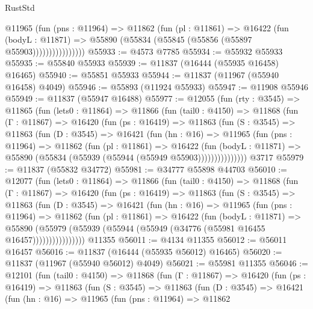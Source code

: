 \begin{lexlean}{RustStd}
\begin{coremodule}
{\begin{coremodule}
{{{{{{{{{{{{{{{{{{{{{{{{{{{{{{{{{{{{{{{{{{{{{{{{{{                    @11965
                      (fun (pns : @11964) =>
                      @11862
                        (fun (pl : @11861) =>
                        @16422
                          (fun (bodyL : @11871) =>
                          @55890 (@55834 (@55845 (@55856 (@55897 @55903))))))))))))))))
@55933 := @4573 @7785
@55934 := @55932 @55933
@55935 := @55840 @55933
@55939 := @11837 (@16444 (@55935 @16458) @16465)
@55940 := @55851 @55933
@55944 := @11837 (@11967 (@55940 @16458) @4049)
@55946 := @55893 (@11924 @55933)
@55947 := @11908 @55946
@55949 := @11837 (@55947 @16488)
@55977 := @12055
    (fun (rty : @3545) =>
    @11865
      (fun (lets0 : @11864) =>
      @11866
        (fun (tail0 : @4150) =>
        @11868
          (fun (Γ : @11867) =>
          @16420
            (fun (ps : @16419) =>
            @11863
              (fun (S : @3545) =>
              @11863
                (fun (D : @3545) =>
                @16421
                  (fun (hn : @16) =>
                  @11965
                    (fun (pns : @11964) =>
                    @11862
                      (fun (pl : @11861) =>
                      @16422
                        (fun (bodyL : @11871) =>
                        @55890 (@55834 (@55939 (@55944 (@55949 @55903)))))))))))))))
    @3717
@55979 := @11837 (@55832 @34772)
@55981 := @34777 @55898 @44703
@56010 := @12077
    (fun (lets0 : @11864) =>
    @11866
      (fun (tail0 : @4150) =>
      @11868
        (fun (Γ : @11867) =>
        @16420
          (fun (ps : @16419) =>
          @11863
            (fun (S : @3545) =>
            @11863
              (fun (D : @3545) =>
              @16421
                (fun (hn : @16) =>
                @11965
                  (fun (pns : @11964) =>
                  @11862
                    (fun (pl : @11861) =>
                    @16422
                      (fun (bodyL : @11871) =>
                      @55890
                        (@55979
                          (@55939 (@55944 (@55949 (@34776 (@55981 @16455 @16457))))))))))))))))
    @11355
@56011 := @4134 @11355
@56012 := @56011 @16457
@56016 := @11837 (@16444 (@55935 @56012) @16465)
@56020 := @11837 (@11967 (@55940 @56012) @4049)
@56021 := @55981 @11355
@56046 := @12101
    (fun (tail0 : @4150) =>
    @11868
      (fun (Γ : @11867) =>
      @16420
        (fun (ps : @16419) =>
        @11863
          (fun (S : @3545) =>
          @11863
            (fun (D : @3545) =>
            @16421
              (fun (hn : @16) =>
              @11965
                (fun (pns : @11964) =>
                @11862
}}}}}}}}}}}}}}}}}}}}}}}}}}}}}}}}}}}}}}}}}}}}}}}}}}
\end{coremodule}}
\end{coremodule}
\end{lexlean}
